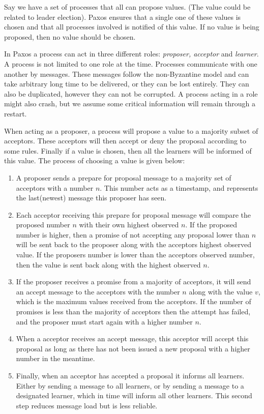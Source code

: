 Say we have a set of processes that all can propose values. (The value could be related to leader election). Paxos ensures that a single one of these values is chosen and that all processes involved is notified of this value. If no value is being proposed, then no value should be chosen. 

In Paxos a process can act in three different roles: \emph{proposer, acceptor} and \emph{learner}. A process is not limited to one role at the time. Processes communicate with one another by messages. These messages follow the non-Byzantine model and can take arbitrary long time to be delivered, or they can be lost entirely. They can also be duplicated, however they can not be corrupted. A process acting in a role might also crash, but we assume some critical information will remain through a restart. 

When acting as a proposer, a process will propose a value to a majority subset of acceptors. These acceptors will then accept or deny the proposal according to some rules. Finally if a value is chosen, then all the learners will be informed of this value. The process of choosing a value is given below:

\begin{enumerate}

\item A proposer sends a prepare for proposal message to a majority set of acceptors with a number $n$. This number acts as a timestamp, and represents the last(newest) message this proposer has seen. 
\item Each acceptor receiving this prepare for proposal message will compare the proposed number $n$ with their own highest observed $n$. If the proposed number is higher, then a promise of not accepting any proposal lower than $n$ will be sent back to the proposer along with the acceptors highest observed value. If the proposers number is lower than the acceptors observed number, then the value is sent back along with the highest observed $n$.
\item If the proposer receives a promise from a majority of acceptors, it will send an accept message to the acceptors with the number $n$ along with the value $v$, which is the maximum values received from the acceptors. If the number of promises is less than the majority of acceptors then the attempt has failed, and the proposer must start again with a higher number $n$.
\item When a acceptor receives an accept message, this acceptor will accept this proposal as long as there has not been issued a new proposal with a higher number in the meantime. 
\item Finally, when an acceptor has accepted a proposal it informs all learners. Either by sending a message to all learners, or by sending a message to a designated learner, which in time will inform all other learners. This second step reduces message load but is less reliable.

\end{enumerate}

